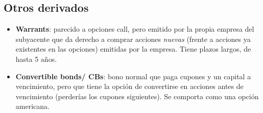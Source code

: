 \subsection{Otros derivados}
\begin{itemize}
    \item \textbf{Warrants}: parecido a opciones call, pero emitido por la propia empresa del subyacente que da derecho a comprar acciones \textit{nuevas} (frente a acciones ya existentes en las opciones) emitidas por la empresa. Tiene plazos largos, de hasta 5 años.
    \item \textbf{Convertible bonds/ CBs}: bono normal que paga cupones y un capital a vencimiento, pero que tiene la opción de convertirse en acciones antes de vencimiento (perderías los cupones siguientes). Se comporta como una opción americana.
\end{itemize}










